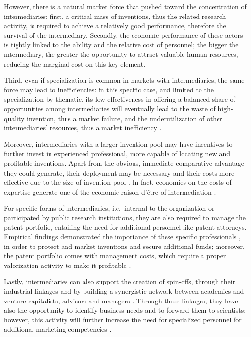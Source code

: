 However, there is a natural market force that pushed toward the concentration of intermediaries: first, a critical mass of inventions, thus the related research activity, is required to achieve a relatively good performance, therefore the survival of the intermediary. Secondly, the economic performance of these actors is tightly linked to the ability and the relative cost of personnel; the bigger the intermediary, the greater the opportunity to attract valuable human resources, reducing the marginal cost on this key element.

Third, even if specialization is common in markets with intermediaries, the same force may lead to inefficiencies: in this specific case, and limited to the specialization by thematic, its low effectiveness in offering a balanced share of opportunities among intermediaries will eventually lead to the waste of high-quality invention, thus a market failure, and the underutilization of other intermediaries' resources, thus a market inefficiency \citep{Hoppe2005}.

Moreover, intermediaries with a larger invention pool may have incentives to further invest in experienced professional, more capable of locating new and profitable inventions. Apart from the obvious, immediate comparative advantage they could generate, their deployment may be necessary and their costs more effective due to the size of invention pool \citep{Debackere2005}. In fact, economies on the costs of expertise generate one of the economic raison d'être of intermediation \citep{Hoppe2005}.

For specific forms of intermediaries, i.e.\ internal to the organization or participated by public research institutions, they are also required to manage the patent portfolio, entailing the need for additional personnel like patent attorneys. Empirical findings demonstrated the importance of these specific professionals \citep{Siegel2003a}, in order to protect and market inventions and secure additional funds; moreover, the patent portfolio comes with management costs, which require a proper valorization activity to make it profitable \citep{Balderi2010}.

Lastly, intermediaries can also support the creation of spin-offs, through their industrial linkages and by building a synergistic network between academics and venture capitalists, advisors and managers \citep{OShea2004}. Through these linkages, they have also the opportunity to identify business needs and to forward them to scientists; however, this activity will further increase the need for specialized personnel for additional marketing competencies \citep{Geuna2009,Muscio2008}. 

